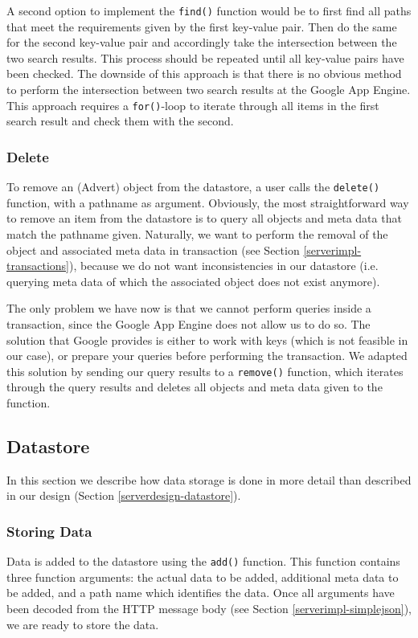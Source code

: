 A second option to implement the \texttt{find()} function would be to first find
all paths that meet the requirements given by the first key-value pair. Then do
the same for the second key-value pair and accordingly take the intersection
between the two search results. This process should be repeated until all
key-value pairs have been checked. The downside of this approach is that there is
no obvious method to perform the intersection between two search results at the
Google App Engine. This approach requires a \texttt{for()}-loop to iterate
through all items in the first search result and check them with the second.

\subsubsection{Delete}
To remove an (Advert) object from the datastore, a user calls the
\texttt{delete()} function, with a pathname as argument. Obviously, the most
straightforward way to remove an item from the datastore is to query all objects
and meta data that match the pathname given. Naturally, we want to perform the
removal of the object and associated meta data in transaction (see Section
\ref{serverimpl-transactions}), because we do not want inconsistencies in our
datastore (i.e. querying meta data of which the associated object does not exist
anymore).

The only problem we have now is that we cannot perform queries inside a
transaction, since the Google App Engine does not allow us to do so. The
solution that Google provides is either to work with keys (which is not
feasible in our case), or prepare your queries before performing the
transaction. We adapted this solution by sending our query results to a
\texttt{remove()} function, which iterates through the query results and
deletes all objects and meta data given to the function.

\subsection{Datastore}
In this section we describe how data storage is done in more detail than
described in our design (Section \ref{serverdesign-datastore}).

\subsubsection{Storing Data}
Data is added to the datastore using the \texttt{add()} function. This function
contains three function arguments: the actual data to be added, additional meta
data to be added, and a path name which identifies the data. Once all arguments
have been decoded from the HTTP message body (see Section
\ref{serverimpl-simplejson}), we are ready to store the data.

